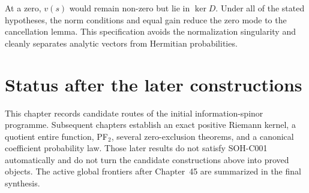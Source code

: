 At a zero, $v(s)$ would remain non-zero but lie in $\ker D$. Under all of the stated hypotheses, the norm conditions and equal gain reduce the zero mode to the cancellation lemma. This specification avoids the normalization singularity and cleanly separates analytic vectors from Hermitian probabilities.

\section{Status after the later constructions}

This chapter records candidate routes of the initial information-spinor programme. Subsequent chapters establish an exact positive Riemann kernel, a quotient entire function, PF$_2$, several zero-exclusion theorems, and a canonical coefficient probability law. Those later results do not satisfy SOH-C001 automatically and do not turn the candidate constructions above into proved objects. The active global frontiers after Chapter~45 are summarized in the final synthesis.

